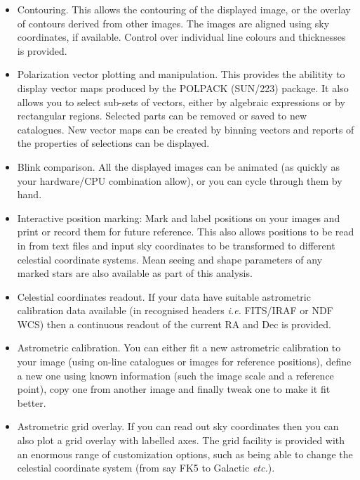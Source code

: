 \documentclass[twoside,11pt]{article}
\newcommand{\xref}[3]{#1}
\renewcommand{\_}{\texttt{\symbol{95}}}
\begin{document}
\begin{itemize}
\item Contouring. This allows the contouring of the displayed image,
 or the overlay of contours derived from other images. The images are
 aligned using sky coordinates, if available. Control over individual
 line colours and thicknesses is provided.

\item Polarization vector plotting and manipulation. This provides the
 abilitity to display vector maps produced by the POLPACK
 (\xref{SUN/223}{sun223}{}) package. It also allows you to select
 sub-sets of vectors, either by algebraic expressions or by rectangular
 regions. Selected parts can be removed or saved to new catalogues. New
 vector maps can be created by binning vectors and reports of the
 properties of selections can be displayed.

\item Blink comparison. All the displayed images can be animated
  (as quickly as your hardware/CPU combination allow), or
  you can cycle through them by hand.

\item Interactive position marking: Mark and label positions on your
  images and print or record them for future reference. This also
  allows positions to be read in from text files and input sky
  coordinates to be transformed to different celestial coordinate
  systems. Mean seeing and shape parameters of any marked stars are
  also available as part of this analysis.

\item Celestial coordinates readout. If your data have suitable
  astrometric calibration data available (in recognised headers
  \textit{i.e.} FITS/IRAF or NDF WCS) then a continuous readout of the
  current RA and Dec is provided.

\item Astrometric calibration. You can either fit a new
  astrometric calibration to your image (using on-line catalogues or
  images for reference positions), define a new one using known
  information (such the image scale and a reference point), copy one
  from another image and finally tweak one to make it fit better.

\item Astrometric grid overlay. If you can read out sky coordinates
  then you can also plot a grid overlay with labelled
  axes. The grid facility is provided with an enormous range of
  customization options, such as being able to change the
  celestial coordinate system (from say FK5 to  Galactic {\em etc.}).


\end{itemize}
\end{document}
